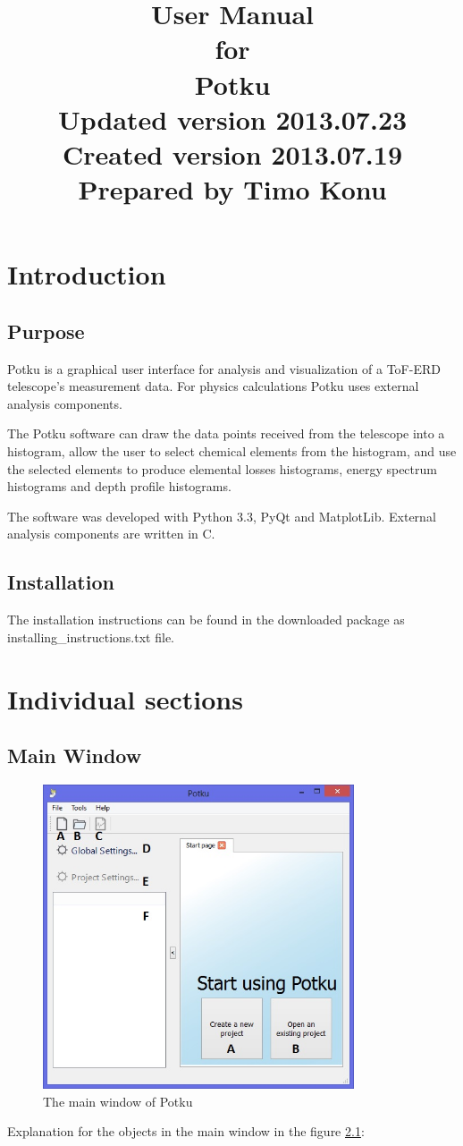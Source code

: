 \documentclass{scrreprt}
\title{\flushright
\Huge{User Manual}\\
\vspace{2cm}
for\\
\vspace{2cm}
Potku\\
\vspace{2cm}
\LARGE{Updated version 2013.07.23\\}
\vspace{2cm}
\LARGE{Created version 2013.07.19\\}
\vspace{2cm}
Prepared by Timo Konu\\
\vfill
}
\date{}
\begin{document}
\maketitle
\tableofcontents
\chapter{Introduction}
\section{Purpose}
Potku is a graphical user interface for analysis and visualization of a ToF-ERD telescope's measurement data. For physics calculations Potku uses external analysis components.

The Potku software can draw the data points received from the telescope into a histogram, allow the user to select chemical elements from the histogram, and use the selected elements to produce elemental losses histograms, energy spectrum histograms and depth profile histograms.

The software was developed with Python 3.3, PyQt and MatplotLib. External analysis components are written in C.

\section{Installation}
The installation instructions can be found in the downloaded package as installing_instructions.txt file.
\chapter{Individual sections}
\section{Main Window}\label{mainwindow}
\begin{figure}[H]
\centering
\includegraphics[height=90mm]{mainwindow}
\caption{The main window of Potku}
\label{fig-mainwindow}
\end{figure}
Explanation for the objects in the main window in the figure \ref{fig-mainwindow}:
\end{document}
